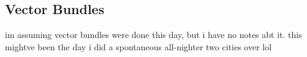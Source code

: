 \subsection{Vector Bundles}

im assuming vector bundles were done this day, but i have no notes abt it.
this mightve been the day i did a spontaneous all-nighter two cities over lol
